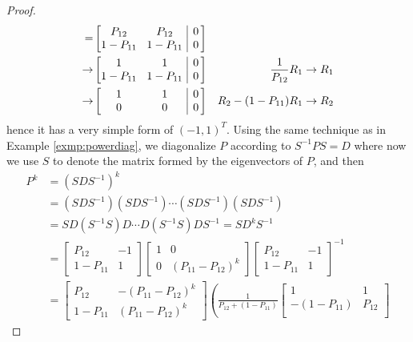 \begin{proof}
\begin{align*}
=& 
\left[\begin{array}{@{}wc{32pt}wc{30pt}|c@{\,}}
P_{12} & P_{12} & 0 \\
1 - P_{11} & 1 - P_{11} & 0 \\
\end{array}\right]  \\
\to& \left[\begin{array}{@{}wc{32pt}wc{30pt}|c@{\,}}
1 & 1 & 0 \\
1 - P_{11} & 1 - P_{11} & 0 \\
\end{array}\right] & \frac{1}{P_{12}}R_1 \to R_1 \\
\to& \left[\begin{array}{@{}wc{32pt}wc{30pt}|c@{\,}}
1 & 1 & 0 \\
0 & 0 & 0 \\
\end{array}\right] & R_2 - (1 - P_{11})R_1 \to R_2
\end{align*}
hence it has a very simple form of $(-1, 1)^T$. Using the same technique as in Example \ref{exmp:powerdiag}, we diagonalize $P$ according to $S^{-1}PS = D$ where now we use $S$ to denote the matrix formed by the eigenvectors of $P$, and then
\begin{align}
P^k &= (SDS^{-1})^k \nonumber \\
&= (SDS^{-1})(SDS^{-1}) \cdots (SDS^{-1})(SDS^{-1}) \nonumber \\
&= SD (S^{-1}S)D \cdots D (S^{-1}S) DS^{-1} = SD^kS^{-1} \nonumber \\
&= 
\begin{bmatrix}
P_{12} & -1 \\
1 - P_{11} & 1
\end{bmatrix}
\begin{bmatrix}
1 & 0 \\
0 & (P_{11} - P_{12})^k
\end{bmatrix}
\begin{bmatrix}
P_{12} & -1 \\
1 - P_{11} & 1
\end{bmatrix}^{-1} \nonumber \\
&= 
\begin{bmatrix}
P_{12} & -(P_{11} - P_{12})^k \\
1 - P_{11} & (P_{11} - P_{12})^k
\end{bmatrix}
\left(\frac{1}{P_{12} + (1 - P_{11})}
\begin{bmatrix}
1 & 1 \\
-(1 - P_{11}) & P_{12} \\

\end{bmatrix}
\end{align}
\end{proof}
